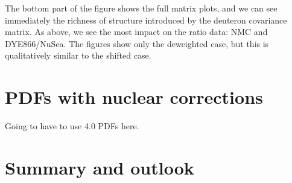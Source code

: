 The bottom part of the figure shows the full matrix plots, and we can see immediately the richness of structure introduced by the deuteron covariance matrix. As above, we see the most impact on the ratio data: NMC and DYE866/NuSea. The figures show only the deweighted case, but this is qualitatively similar to the shifted case. 
\section{PDFs with nuclear corrections}
\label{sec:nucpdfs}
Going to have to use 4.0 PDFs here.
\section{Summary and outlook}
\label{sec:summandoutlook}
